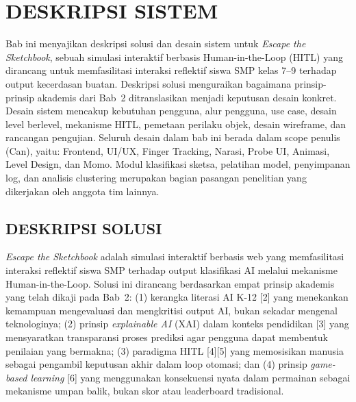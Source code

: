 \documentclass[10pt,twoside,openright]{report}
\begin{document}

\chapter{DESKRIPSI SISTEM}
\label{chap:bab3}

Bab ini menyajikan deskripsi solusi dan desain sistem untuk \textit{Escape the Sketchbook}, sebuah simulasi interaktif berbasis Human-in-the-Loop (HITL) yang dirancang untuk memfasilitasi interaksi reflektif siswa SMP kelas 7--9 terhadap output kecerdasan buatan. Deskripsi solusi menguraikan bagaimana prinsip-prinsip akademis dari Bab~2 ditranslasikan menjadi keputusan desain konkret. Desain sistem mencakup kebutuhan pengguna, alur pengguna, use case, desain level berlevel, mekanisme HITL, pemetaan perilaku objek, desain wireframe, dan rancangan pengujian. Seluruh desain dalam bab ini berada dalam scope penulis (Can), yaitu: Frontend, UI/UX, Finger Tracking, Narasi, Probe UI, Animasi, Level Design, dan Momo. Modul klasifikasi sketsa, pelatihan model, penyimpanan log, dan analisis clustering merupakan bagian pasangan penelitian yang dikerjakan oleh anggota tim lainnya.


\section{DESKRIPSI SOLUSI}
\label{sec:deskripsi-solusi}

\textit{Escape the Sketchbook} adalah simulasi interaktif berbasis web yang memfasilitasi interaksi reflektif siswa SMP terhadap output klasifikasi AI melalui mekanisme Human-in-the-Loop. Solusi ini dirancang berdasarkan empat prinsip akademis yang telah dikaji pada Bab~2: (1) kerangka literasi AI K-12 [2] yang menekankan kemampuan mengevaluasi dan mengkritisi output AI, bukan sekadar mengenal teknologinya; (2) prinsip \textit{explainable AI} (XAI) dalam konteks pendidikan [3] yang mensyaratkan transparansi proses prediksi agar pengguna dapat membentuk penilaian yang bermakna; (3) paradigma HITL [4][5] yang memosisikan manusia sebagai pengambil keputusan akhir dalam loop otomasi; dan (4) prinsip \textit{game-based learning} [6] yang menggunakan konsekuensi nyata dalam permainan sebagai mekanisme umpan balik, bukan skor atau leaderboard tradisional.
\end{document}
